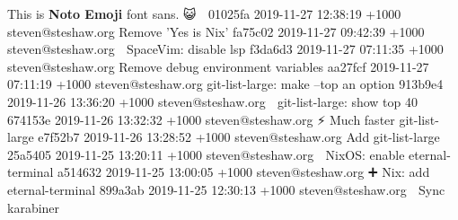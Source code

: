 \documentclass{article}
\begin{document}
  This is \textbf{Noto Emoji} font sans.
  {\sffamily 😺 👅 }\newline
  {\texttt\newline
01025fa 2019-11-27 12:38:19 +1000 steven@steshaw.org Remove 'Yes is Nix'\newline
fa75c02 2019-11-27 09:42:39 +1000 steven@steshaw.org {\sffamily🔧} SpaceVim: disable lsp\newline
f3da6d3 2019-11-27 07:11:35 +1000 steven@steshaw.org Remove debug environment variables\newline
aa27fcf 2019-11-27 07:11:19 +1000 steven@steshaw.org git-list-large: make --top an option\newline
913b9e4 2019-11-26 13:36:20 +1000 steven@steshaw.org {\sffamily🔧} git-list-large: show top 40\newline
674153e 2019-11-26 13:32:32 +1000 steven@steshaw.org {\sffamily⚡️} Much faster git-list-large\newline
e7f52b7 2019-11-26 13:28:52 +1000 steven@steshaw.org Add git-list-large\newline
25a5405 2019-11-25 13:20:11 +1000 steven@steshaw.org {\sffamily🔧} NixOS: enable eternal-terminal\newline
a514632 2019-11-25 13:00:05 +1000 steven@steshaw.org {\sffamily➕} Nix: add eternal-terminal\newline
899a3ab 2019-11-25 12:30:13 +1000 steven@steshaw.org {\sffamily🔧} Sync karabiner\newline
}
\end{document}
